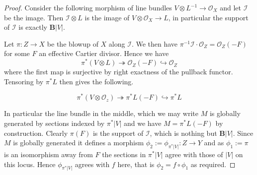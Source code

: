 \documentclass[a4paper,12pt]{book}
\newcommand{\BB}{\mathbf{B}}
\newcommand{\ox}[1][X]{\mathcal{O}_{#1}}
\begin{document}
\begin{proof}
	
	Consider the following morphism of line bundles
	$V \otimes L^{-1} \to \ox$
	and let $\mathcal{I}$ be the image. Then $\mathcal{I} \otimes L$ is the image of $V \otimes \ox \to L$, in particular the support of $\mathcal{I}$ is exactly $\BB|V|$.
	
	Let $\pi:Z \to X$ be the blowup of $X$ along $\mathcal{I}$. We then have $\pi^{-1}\mathcal{I}\cdot \ox[Z]=\ox[Z](-F)$ for some $F$ an effective Cartier divisor. Hence we have
	\[\pi^{*}(V\otimes L) \twoheadrightarrow \ox[Z](-F) \hookrightarrow \ox[Z] \]
	where the first map is surjective by right exactness of the pullback functor. Tensoring by $\pi^{*}L$ then gives the following.
	
	\[\pi^{*}(V\otimes \ox[z]) \twoheadrightarrow \pi^{*}L(-F) \hookrightarrow \pi^{*}L \]
	
	In particular the line bundle in the middle, which we may write $M$ is globally generated by sections indexed by $\pi^{*}|V|$ and we have $M=\pi^{*}L(-F)$ by construction. Clearly $\pi(F)$ is the support of $\mathcal{I}$, which is nothing but $\BB|V|$. Since $M$ is globally generated it defines a morphism $\phi_{2}:=\phi_{\pi^{*}|V|}:Z \to Y$ and as $\phi_{1}:=\pi$ is an isomorphism away from $F$ the sections in $\pi^{*}|V|$ agree with those of $|V|$ on this locus. Hence $\phi_{\pi^{*}|V|}$ agrees with $f$ here, that is $\phi_{2}=f\circ \phi_{1}$ as required. 
\end{proof}

%	
%	
%
%	
%	
%	
%	
%	
\end{document}
